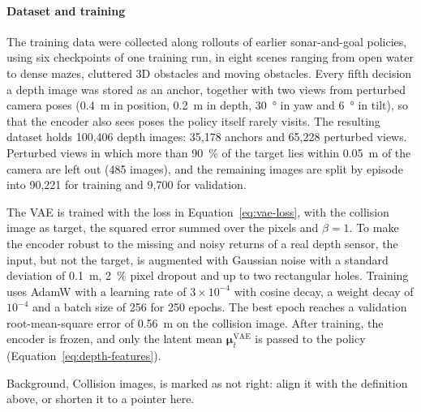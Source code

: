\paragraph{Dataset and training}
The training data were collected along rollouts of earlier sonar-and-goal policies, using six checkpoints of one training run, in eight scenes ranging from open water to dense mazes, cluttered 3D obstacles and moving obstacles. Every fifth decision a depth image was stored as an anchor, together with two views from perturbed camera poses (\SI{0.4}{\metre} in position, \SI{0.2}{\metre} in depth, \SI{30}{\degree} in yaw and \SI{6}{\degree} in tilt), so that the encoder also sees poses the policy itself rarely visits. The resulting dataset holds 100,406 depth images: 35,178 anchors and 65,228 perturbed views. Perturbed views in which more than \SI{90}{\percent} of the target lies within \SI{0.05}{\metre} of the camera are left out (485 images), and the remaining images are split by episode into 90,221 for training and 9,700 for validation.

The VAE is trained with the loss in Equation~\eqref{eq:vae-loss}, with the collision image as target, the squared error summed over the pixels and $\beta = 1$. To make the encoder robust to the missing and noisy returns of a real depth sensor, the input, but not the target, is augmented with Gaussian noise with a standard deviation of \SI{0.1}{\metre}, \SI{2}{\percent} pixel dropout and up to two rectangular holes. Training uses AdamW with a learning rate of $3\times10^{-4}$ with cosine decay, a weight decay of $10^{-4}$ and a batch size of 256 for 250 epochs. The best epoch reaches a validation root-mean-square error of \SI{0.56}{\metre} on the collision image. After training, the encoder is frozen, and only the latent mean $\boldsymbol{\mu}^{\mathrm{VAE}}_t$ is passed to the policy (Equation~\eqref{eq:depth-features}).

\begin{todolist}
  \item Background, Collision images, is marked as not right: align it with the definition above, or shorten it to a pointer here.
\end{todolist}

